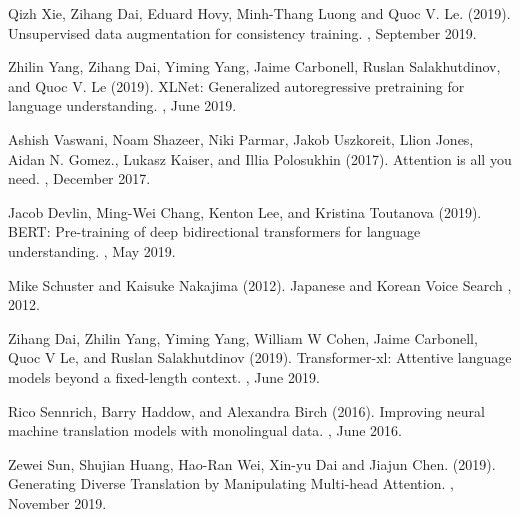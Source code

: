 \documentclass[twoside,twocolumn,10pt]{article}
\begin{document}
\begin{thebibliography}{99} %

Qizh Xie, Zihang Dai, Eduard Hovy, Minh-Thang Luong and Quoc V. Le. (2019).
\newblock Unsupervised data augmentation for consistency training.
, September 2019.

Zhilin Yang, Zihang Dai, Yiming Yang, Jaime Carbonell, Ruslan Salakhutdinov, and Quoc V. Le (2019).
\newblock XLNet: Generalized autoregressive pretraining for language understanding.
, June 2019.

Ashish Vaswani, Noam Shazeer, Niki Parmar, Jakob Uszkoreit, Llion Jones, Aidan N. Gomez., Lukasz Kaiser, and Illia Polosukhin (2017).
\newblock Attention is all you need.
, December 2017.

Jacob Devlin, Ming-Wei Chang, Kenton Lee, and Kristina Toutanova (2019).
\newblock BERT: Pre-training of deep bidirectional transformers for language understanding.
, May 2019.

Mike Schuster and Kaisuke Nakajima (2012).
\newblock Japanese and Korean Voice Search
 , 2012.
 
Zihang Dai, Zhilin Yang, Yiming Yang, William W Cohen, Jaime Carbonell, Quoc V Le,
and Ruslan Salakhutdinov (2019).
\newblock Transformer-xl: Attentive language models beyond a fixed-length
 context. 
, June 2019.

Rico Sennrich, Barry Haddow, and Alexandra Birch (2016). 
\newblock Improving neural machine translation models with monolingual data. 
, June 2016.

Zewei Sun, Shujian Huang, Hao-Ran Wei, Xin-yu Dai and Jiajun Chen. (2019).
\newblock Generating Diverse Translation by Manipulating Multi-head Attention.
, November 2019.
 
\end{thebibliography}
\clearpage
\appendix
\onecolumn
\setcounter{table}{0}
\renewcommand{\thetable}{A\arabic{table}}
\renewcommand{\tableformat}{\tablename~\thetable}
\end{document}
